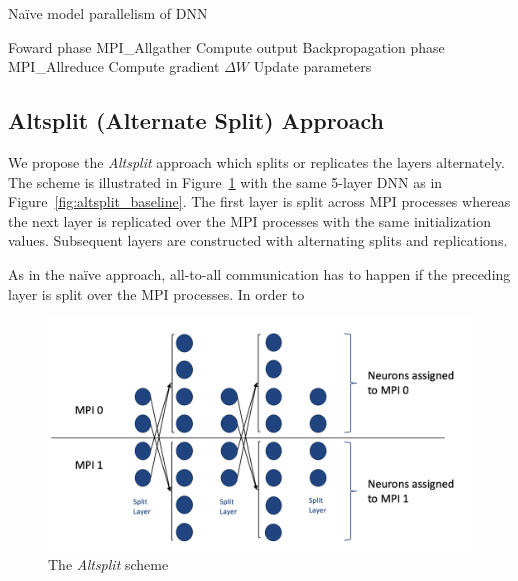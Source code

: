 \begin{algorithm}[H]
\caption{Na\"{i}ve model parallelism of DNN}
\label{alg:altsplit_baseline}
{\fontsize{10}{10}\selectfont
\begin{algorithmic}[1]
        \Comment Foward phase
            \State MPI\_Allgather
                \State Compute output
            \EndFor
        \EndFor
    \EndFor
        \Comment Backpropagation phase
            \State MPI\_Allreduce
                \State Compute gradient $\Delta W$
            \EndFor
        \EndFor
    \EndFor
        \State Update parameters
    \EndFor
\end{algorithmic}}
\end{algorithm}

\subsection{Altsplit (Alternate Split) Approach}
We propose the \emph{Altsplit} approach which splits or replicates the layers 
alternately. The scheme is illustrated in Figure~\ref{fig:altsplit_scheme} with 
the same 5-layer DNN as in Figure~\ref{fig:altsplit_baseline}. The first layer 
is split across MPI processes whereas the next layer is replicated over 
the MPI processes with the same initialization values. Subsequent layers are 
constructed with alternating splits and replications.

As in the na\"{i}ve approach, all-to-all communication has to happen if the 
preceding layer is split over the MPI processes. In order to 

\begin{figure}[H]
    \centerline{\includegraphics[scale=0.60]{altsplit/figs/altsplit.png}}
    \caption{The \emph{Altsplit} scheme}
    \label{fig:altsplit_scheme}
\end{figure}
